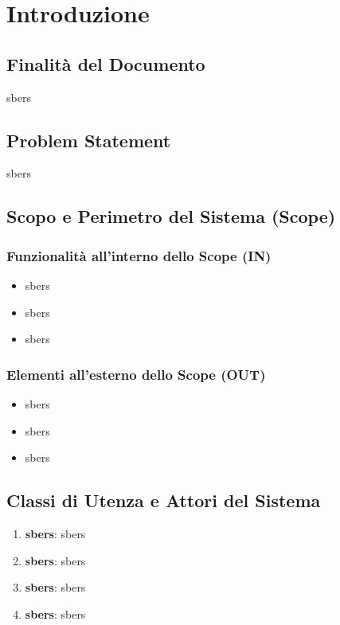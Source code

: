 \section{Introduzione}

\subsection{Finalità del Documento}
sbers

\subsection{Problem Statement}
sbers

\subsection{Scopo e Perimetro del Sistema (Scope)}

\subsubsection{Funzionalità all'interno dello Scope (IN)}
\begin{itemize}
    \item sbers
    \item sbers
    \item sbers
\end{itemize}

\subsubsection{Elementi all'esterno dello Scope (OUT)}
\begin{itemize}
    \item sbers
    \item sbers
    \item sbers
\end{itemize}

\subsection{Classi di Utenza e Attori del Sistema}
\begin{enumerate}
    \item \textbf{sbers}: sbers
    \item \textbf{sbers}: sbers
    \item \textbf{sbers}: sbers
    \item \textbf{sbers}: sbers
\end{enumerate}
